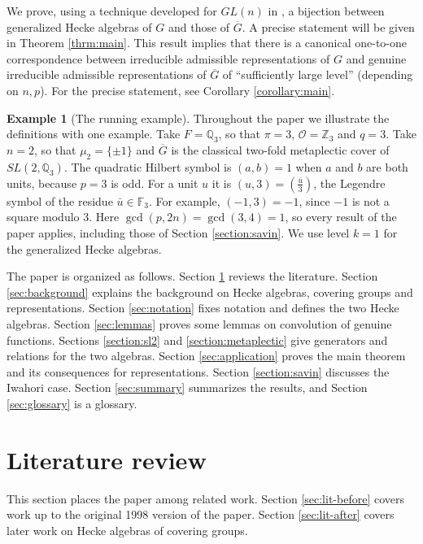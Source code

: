 \documentclass[12pt,letterpaper,reqno]{amsart}
\let\cal\mathcal
\theoremstyle{definition}
\newtheorem{example}[theorem]{Example}
\theoremstyle{remark}
\numberwithin{equation}{section}
\begin{document}
We prove, using a technique developed for $GL(n)$ in \cite{HM85}, a bijection
between generalized Hecke algebras of $G$ and those of $\overline{G}$. A
precise statement will be given in Theorem \ref{thrm:main}. This result
implies that there is a canonical one-to-one correspondence between
irreducible admissible representations of $G$ and genuine irreducible
admissible representations of $\overline{G}$ of ``sufficiently large level''
(depending on $n,p$). For the precise statement, see Corollary
\ref{corollary:main}.

\begin{example}[The running example]
\label{ex:running}
Throughout the paper we illustrate the definitions with one example. Take
$F=\mathbb{Q}_3$, so that $\pi=3$, ${\cal O}=\mathbb{Z}_3$ and $q=3$. Take
$n=2$, so that $\mu_2=\{\pm 1\}$ and $\overline{G}$ is the classical
two-fold metaplectic cover of $SL(2,\mathbb{Q}_3)$. The quadratic Hilbert
symbol is $(a,b)=1$ when $a$ and $b$ are both units, because $p=3$ is odd. For
a unit $u$ it is $(u,3)=\left(\frac{\bar{u}}{3}\right)$, the Legendre symbol
of the residue $\bar{u}\in\mathbb{F}_3$. For example, $(-1,3)=-1$, since $-1$
is not a square modulo $3$. Here $\gcd(p,2n)=\gcd(3,4)=1$, so every result of
the paper applies, including those of Section \ref{section:savin}. We use
level $k=1$ for the generalized Hecke algebras.
\end{example}

The paper is organized as follows. Section \ref{sec:litreview} reviews the
literature. Section \ref{sec:background} explains the background on Hecke
algebras, covering groups and representations. Section \ref{sec:notation}
fixes notation and defines the two Hecke algebras. Section \ref{sec:lemmas}
proves some lemmas on convolution of genuine functions. Sections
\ref{section:sl2} and \ref{section:metaplectic} give generators and relations
for the two algebras. Section \ref{sec:application} proves the main theorem
and its consequences for representations. Section \ref{section:savin}
discusses the Iwahori case. Section \ref{sec:summary} summarizes the results,
and Section \ref{sec:glossary} is a glossary.

\section{Literature review}
\label{sec:litreview}

This section places the paper among related work. Section \ref{sec:lit-before}
covers work up to the original 1998 version of the paper. Section
\ref{sec:lit-after} covers later work on Hecke algebras of covering groups.
\end{document}
